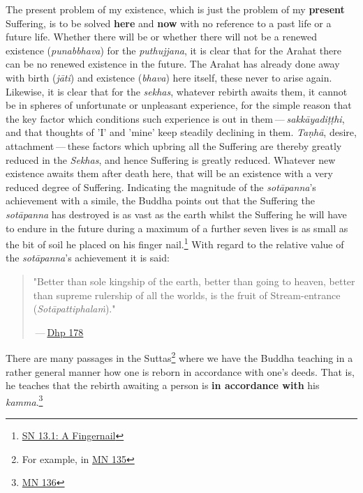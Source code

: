 The present problem of my existence, which is just the problem of my
\textbf{present} Suffering, is to be solved \textbf{here} and \textbf{now} with no reference
to a past life or a future life. Whether there will be or whether there
will not be a renewed existence (\emph{punabbhava}) for the \emph{puthujjana},
it is clear that for the Arahat there can be no renewed existence in the
future. The Arahat has already done away with birth (\emph{jāti}) and
existence (\emph{bhava}) here itself, these never to arise again. Likewise,
it is clear that for the \emph{sekhas}, whatever rebirth awaits them, it
cannot be in spheres of unfortunate or unpleasant experience, for the
simple reason that the key factor which conditions such experience is
out in them — \emph{sakkāyadiṭṭhi}, and that thoughts of 'I' and 'mine'
keep steadily declining in them. \emph{Taṇhā}, desire, attachment — these
factors which upbring all the Suffering are thereby greatly reduced in
the \emph{Sekhas}, and hence Suffering is greatly reduced. Whatever new
existence awaits them after death here, that will be an existence with a
very reduced degree of Suffering. Indicating the magnitude of the
\emph{sotāpanna}'s achievement with a simile, the Buddha points out that
the Suffering the \emph{sotāpanna} has destroyed is as vast as the earth
whilst the Suffering he will have to endure in the future during a
maximum of a further seven lives is as small as the bit of soil he
placed on his finger nail.\footnote{\href{https://suttacentral.net/sn13.1/en/sujato}{SN 13.1: A Fingernail}}
With regard to the relative
value of the \emph{sotāpanna}'s achievement it is said:


\begin{quotation}
"Better than sole
kingship of the earth, better than going to heaven, better than supreme
rulership of all the worlds, is the fruit of Stream-entrance
(\emph{Sotāpattiphalaṁ})."


 — \href{https://suttacentral.net/dhp167-178/en/sujato}{Dhp 178}


\end{quotation}

There are many passages in the Suttas\footnote{For example, in \href{https://suttacentral.net/mn135/en/bodhi}{MN 135}}
where we have the Buddha teaching in a rather
general manner how one is reborn in accordance with one’s deeds. That
is, he teaches that the rebirth awaiting a person is \textbf{in accordance with} his \emph{kamma}.\footnote{\href{https://suttacentral.net/mn136/en/thanissaro}{MN 136}}



